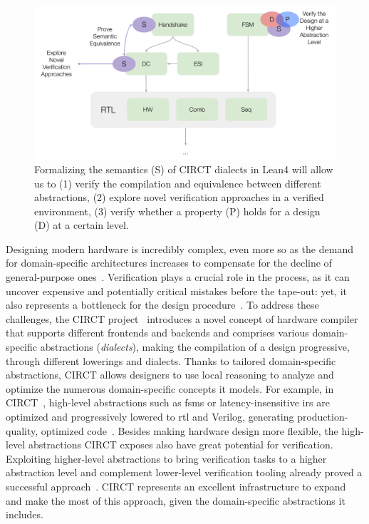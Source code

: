 \documentclass[sigconf,authorversion,nonacm, 11pt]{acmart}
\begin{document}
\begin{figure}[ht]
    \includegraphics[scale=0.8]{semantics.pdf}
    \caption{Formalizing the semantics (S) of CIRCT dialects in Lean4 will allow us to (1) verify the compilation and equivalence 
    between different abstractions, (2) explore novel verification approaches in a verified environment, (3) verify whether a property
    (P) holds for a design (D) at a certain level.}
\end{figure}

Designing modern hardware is incredibly complex, even more so as the demand for domain-specific architectures increases to compensate for the decline of general-purpose ones~\cite{asanovic2006landscape, hennessy2018new}. 
Verification plays a crucial role in the process, as it can uncover expensive and potentially critical mistakes before the tape-out: yet, it also represents a bottleneck for the design procedure~\cite{foster2013design, wilson2020verifstudy, vasudevan2021learning}. 
To address these challenges, the CIRCT project~\cite{circt, mlir_circt} introduces a novel concept of hardware compiler that supports different frontends and backends and comprises various domain-specific abstractions (\textit{dialects}), making the compilation of a design progressive, through different lowerings and dialects. 
Thanks to tailored domain-specific abstractions, CIRCT allows designers to use local reasoning to analyze and optimize the numerous domain-specific concepts it models.
For example, in CIRCT~\cite{circt, mlir_circt}, high-level abstractions such as \acp{fsm} or latency-insensitive \acp{ir} are optimized and progressively lowered to \ac{rtl} and Verilog, generating production-quality, optimized code~\cite{circt_sifive}. 
Besides making hardware design more flexible, the high-level abstractions CIRCT exposes also have great potential for verification.
Exploiting higher-level abstractions to bring verification tasks to a higher abstraction level and complement lower-level verification tooling already proved a successful approach~\cite{huang2018instruction, chen2021leveraging, mattarei2018cosa, hunt2006sat}.
CIRCT represents an excellent infrastructure to expand and make the most of this approach, given the domain-specific abstractions it includes.
\end{document}
